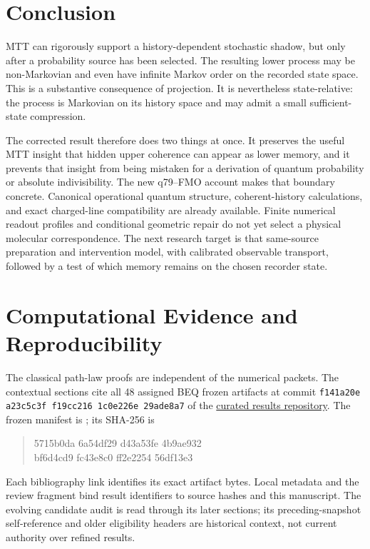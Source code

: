 \documentclass[11pt]{article}
\theoremstyle{definition}
\theoremstyle{remark}
\begin{document}
\section{Conclusion}

MTT can rigorously support a history-dependent stochastic shadow, but only
after a probability source has been selected.  The resulting lower process
may be non-Markovian and even have infinite Markov order on the recorded state
space.  This is a substantive consequence of projection.  It is nevertheless
state-relative: the process is Markovian on its history space and may admit a
small sufficient-state compression.

The corrected result therefore does two things at once.  It preserves the
useful MTT insight that hidden upper coherence can appear as lower memory, and
it prevents that insight from being mistaken for a derivation of quantum
probability or absolute indivisibility. The new q79--FMO account makes that
boundary concrete. Canonical operational quantum structure, coherent-history
calculations, and exact charged-line compatibility are already available.
Finite numerical readout profiles and conditional geometric repair do not
yet select a physical molecular correspondence. The next research target
is that same-source preparation and intervention model, with calibrated
observable transport, followed by a test of which memory remains on the
chosen recorder state.

\small


\section*{Computational Evidence and Reproducibility}
The classical path-law proofs are independent of the numerical packets.
The contextual sections cite all 48 assigned BEQ frozen artifacts at commit
\texttt{f141a20e a23c5c3f f19cc216 1c0e226e 29ade8a7} of the
\href{https://github.com/PeterNero/mtt-results-repro}{curated results repository}.
The frozen manifest is ; its SHA-256 is
\begin{quote}\small\ttfamily
5715b0da 6a54df29 d43a53fe 4b9ae932\\
bf6d4cd9 fc43e8c0 ff2e2254 56df13e3
\end{quote}
Each bibliography link identifies its exact artifact bytes. Local metadata
and the review fragment bind result identifiers to source hashes and this
manuscript. The evolving candidate audit is read through its later sections;
its preceding-snapshot self-reference and older eligibility headers are
historical context, not current authority over refined results.
\end{document}
